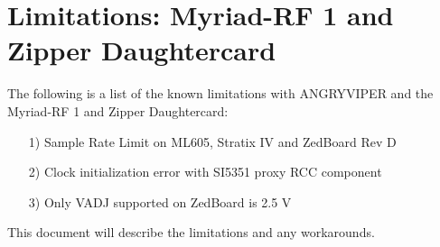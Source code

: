 \iffalse
This file is protected by Copyright. Please refer to the COPYRIGHT file
distributed with this source distribution.

This file is part of OpenCPI <http://www.opencpi.org>

OpenCPI is free software: you can redistribute it and/or modify it under the
terms of the GNU Lesser General Public License as published by the Free Software
Foundation, either version 3 of the License, or (at your option) any later
version.

OpenCPI is distributed in the hope that it will be useful, but WITHOUT ANY
WARRANTY; without even the implied warranty of MERCHANTABILITY or FITNESS FOR A
PARTICULAR PURPOSE. See the GNU Lesser General Public License for more details.

You should have received a copy of the GNU Lesser General Public License along
with this program. If not, see <http://www.gnu.org/licenses/>.
\fi


\usepackage{graphicx}
\graphicspath{ {figures/} }
\usepackage{fancyhdr}
\usepackage{colortbl}
\usepackage[justification=centering]{caption}
\pagestyle{fancy}
\renewcommand{\headrulewidth}{0pt}

\section*{Limitations: Myriad-RF 1 and Zipper Daughtercard}
The following is a list of the known limitations with ANGRYVIPER and the Myriad-RF 1 and Zipper Daughtercard:\par
	\begin{itemize}
	\item[1)] Sample Rate Limit on ML605, Stratix IV and ZedBoard Rev D
	\item[2)] Clock initialization error with SI5351 proxy RCC component
	\item[3)] Only VADJ supported on ZedBoard is 2.5 V
	\end{itemize}
This document will describe the limitations and any workarounds.
